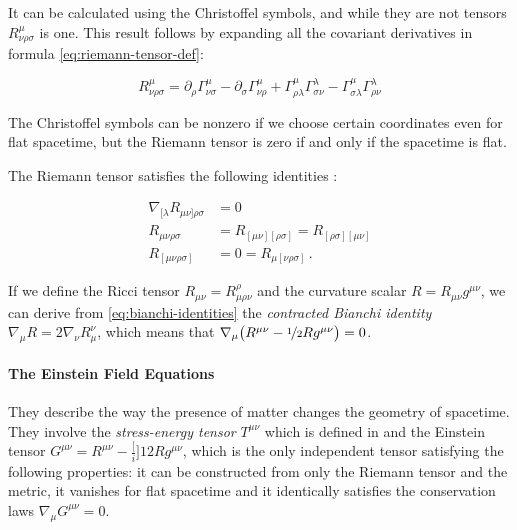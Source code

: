 \documentclass[main.tex]{subfiles}
\begin{document}
It can be calculated using the Christoffel symbols, and while they are not tensors \(R ^{\mu} _{\nu \rho \sigma}\) is one. This result follows by expanding all the covariant derivatives in formula \eqref{eq:riemann-tensor-def}:

\begin{equation}
    R ^{\mu} _{\nu \rho \sigma} =
     \partial_\rho \Gamma^\mu_{\nu \sigma}
    -\partial_\sigma \Gamma^\mu_{\nu \rho}
    +\Gamma^\mu_{\rho \lambda} \Gamma ^{\lambda} _{\sigma \nu}
    -\Gamma^\mu_{\sigma \lambda} \Gamma ^{\lambda} _{\rho \nu}
\end{equation}

The Christoffel symbols can be nonzero if we choose certain coordinates even for flat spacetime, but the Riemann tensor is zero if and only if the spacetime is flat.

The Riemann tensor satisfies the following identities \cite[eqs. 8.45 and 8.76]{MisnerThorneWheeler:1973}:

\vspace{-.5cm}

\begin{subequations}
\begin{align}
  \nabla _{[\lambda} R_{\mu\nu]\rho \sigma} &= 0 \label{eq:bianchi-identities}  \\
  R_{\mu\nu\rho\sigma} &= R_{[\mu\nu][\rho\sigma]} = R_{[\rho\sigma][\mu\nu]}  \\
  R_{[\mu\nu\rho\sigma]} &= 0 = R_{\mu[\nu\rho\sigma]} \,.
\end{align}
\end{subequations}

If we define the Ricci tensor \(R_{\mu\nu} = R^\rho_{\mu \rho \nu}\) and the curvature scalar \(R = R_{\mu\nu}g^{\mu\nu}\), we can derive from \eqref{eq:bianchi-identities} the \emph{contracted Bianchi identity}  \(\nabla_\mu R = 2 \nabla_\nu R^{\nu}_{\mu}\), which means that \(\nabla_\mu \qty(R^{\mu\nu} - \frac[i]{1}{2} R g^{\mu\nu}) = 0\).

\paragraph{The Einstein Field Equations}

They describe the way the presence of matter changes the geometry of spacetime.
They involve the \emph{stress-energy tensor} \(T^{\mu\nu}\) which is defined in  and the Einstein tensor \(G^{\mu\nu} = R^{\mu\nu} - \frac[i]{1}{2} R g^{\mu\nu}\), which is the only independent tensor satisfying the following properties: it can be constructed from only the Riemann tensor and the metric, it vanishes for flat spacetime and it identically satisfies the conservation laws \(\nabla_\mu G^{\mu\nu} = 0\).
\end{document}
